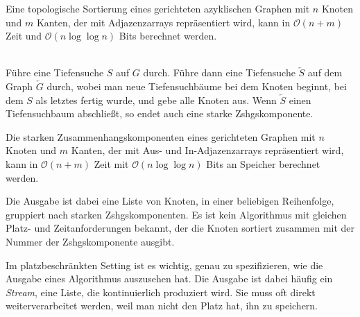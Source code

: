 \documentclass{cheat-sheet}
\renewcommand{\O}{\mathcal{O}} %
\begin{document}
\begin{kor}
  Eine topologische Sortierung eines gerichteten azyklischen Graphen mit $n$ Knoten und $m$ Kanten, der mit Adjazenzarrays repräsentiert wird, kann in $\O(n + m)$ Zeit und $\O(n \log \log n)$ Bits berechnet werden.
\end{kor}



\begin{alg} \mbox{}\\
  Führe eine Tiefensuche $S$ auf $G$ durch.
  Führe dann eine Tiefensuche $\overleftarrow{S}$ auf dem Graph $\overleftarrow{G}$ durch, wobei man neue Tiefensuchbäume bei dem Knoten beginnt, bei dem $S$ als letztes fertig wurde, und gebe alle Knoten aus.
  Wenn $\overleftarrow{S}$ einen Tiefensuchbaum abschließt, so endet auch eine starke Zshgskomponente.
\end{alg}

\begin{thm}
  Die starken Zusammenhangskomponenten eines gerichteten Graphen mit $n$ Knoten und $m$ Kanten, der mit Aus- und In-Adjazenzarrays repräsentiert wird, kann in $\O(n + m)$ Zeit mit $\O(n \log \log n)$ Bits an Speicher berechnet werden.
\end{thm}

\begin{bem}
  Die Ausgabe ist dabei eine Liste von Knoten, in einer beliebigen Reihenfolge, gruppiert nach starken Zshgskomponenten.
  Es ist kein Algorithmus mit gleichen Platz- und Zeitanforderungen bekannt, der die Knoten sortiert zusammen mit der Nummer der Zshgskomponente ausgibt.
\end{bem}


\begin{folgerung}
  Im platzbeschränkten Setting ist es wichtig, genau zu spezifizieren, wie die Ausgabe eines Algorithmus auszusehen hat.
  Die Ausgabe ist dabei häufig ein \textit{Stream}, eine Liste, die kontinuierlich produziert wird.
  Sie muss oft direkt weiterverarbeitet werden, weil man nicht den Platz hat, ihn zu speichern.
\end{folgerung}


\end{document}

